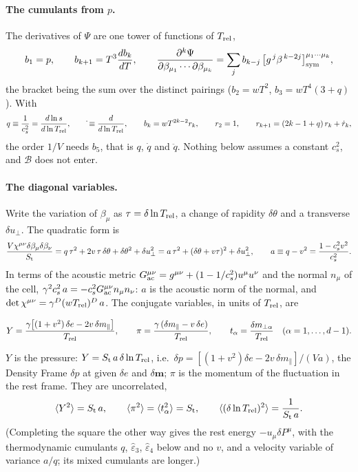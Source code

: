 \documentclass[11pt,aps,preprint,nofootinbib,superscriptaddress,tightenlines]{revtex4-2}
\newcommand{\avg}[1]{\langle #1\rangle}
\def\st{\begin{equation}}
\def\stp{\end{equation}}
\let\oldparagraph\paragraph
\renewcommand{\paragraph}{\par\bigskip\oldparagraph}
\begin{document}
\paragraph{The cumulants from $p$.}  The derivatives of $\Psi$ are one tower of functions of $T_{\rm rel}$,
\st
b_1=p,\qquad b_{k+1}=T^3\frac{db_k}{dT},\qquad
\frac{\partial^k\Psi}{\partial\beta_{\mu_1}\cdots\partial\beta_{\mu_k}}=\sum_jb_{k-j}\,\big[g^{\,j}\beta^{\,k-2j}\big]^{\mu_1\cdots\mu_k}_{\rm sym} ,
\stp
the bracket being the sum over the distinct pairings ($b_2=wT^2$, $b_3=wT^4(3+q)$).  With
\st
q\equiv\frac1{c_s^2}=\frac{d\ln s}{d\ln T_{\rm rel}},\qquad \dot{}\equiv\frac{d}{d\ln T_{\rm rel}},\qquad
b_k=wT^{2k-2}r_k,\qquad r_2=1,\qquad r_{k+1}=(2k-1+q)\,r_k+\dot r_k ,
\stp
the order $1/V$ needs $b_5$, that is $q$, $\dot q$ and $\ddot q$.  Nothing below assumes a constant $c_s^2$, and $\mathcal B$ does not enter.

\paragraph{The diagonal variables.}  Write the variation of $\beta_\mu$ as $\tau=\delta\ln T_{\rm rel}$, a change of rapidity $\delta\theta$ and a
transverse $\delta u_\perp$.  The quadratic form is
\st
\frac{V\chi^{\mu\nu}\delta\beta_\mu\delta\beta_\nu}{S_{\rm t}}=q\,\tau^2+2v\,\tau\,\delta\theta+\delta\theta^2+\delta u_\perp^2
=a\,\tau^2+(\delta\theta+v\tau)^2+\delta u_\perp^2,\qquad
a\equiv q-v^2=\frac{1-c_s^2v^2}{c_s^2} .
\stp
In terms of the acoustic metric $G_{\rm ac}^{\mu\nu}=g^{\mu\nu}+(1-1/c_s^2)u^\mu u^\nu$ and the normal $n_\mu$ of the cell,
$\gamma^2c_s^2\,a=-c_s^2G_{\rm ac}^{\mu\nu}n_\mu n_\nu$: $a$ is the acoustic norm of the normal, and
$\det\chi^{\mu\nu}=\gamma^D(wT_{\rm rel})^D\,a$.  The conjugate variables, in units of $T_{\rm rel}$, are
\begin{keyeq}
\st
Y=\frac{\gamma\big[(1+v^2)\,\delta e-2v\,\delta m_\parallel\big]}{T_{\rm rel}},\qquad
\pi=\frac{\gamma\,(\delta m_\parallel-v\,\delta e)}{T_{\rm rel}},\qquad
t_\alpha=\frac{\delta m_{\perp\alpha}}{T_{\rm rel}}\quad(\alpha=1,\dots,d-1) .
\label{diagvars}
\stp
\end{keyeq}
$Y$ is the pressure: $Y=S_{\rm t}\,a\,\delta\ln T_{\rm rel}$, i.e.\ $\delta p=[(1+v^2)\delta e-2v\,\delta m_\parallel]/(Va)$, the Density Frame
$\delta p$ at given $\delta e$ and $\delta\bm m$; $\pi$ is the momentum of the fluctuation in the rest frame.  They are uncorrelated,
\st
\avg{Y^2}=S_{\rm t}\,a,\qquad \avg{\pi^2}=\avg{t_\alpha^2}=S_{\rm t},\qquad \avg{(\delta\ln T_{\rm rel})^2}=\frac1{S_{\rm t}\,a} .
\stp
(Completing the square the other way gives the rest energy $-u_\mu\delta P^\mu$, with the thermodynamic cumulants $q$, $\hat\varepsilon_3$,
$\hat\varepsilon_4$ below and no $v$, and a velocity variable of variance $a/q$; its mixed cumulants are longer.)
\end{document}
